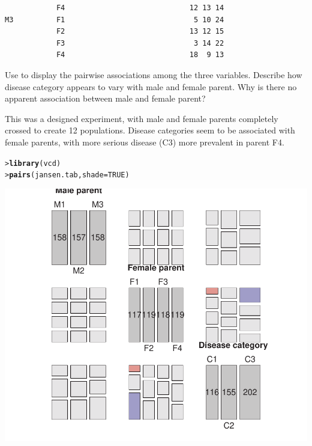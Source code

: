 \documentclass[10pt]{report}\usepackage[]{graphicx}\usepackage[]{color}
\makeatletter
\newcommand{\hlnum}[1]{\textcolor[rgb]{0.686,0.059,0.569}{#1}}%
\newcommand{\hlstd}[1]{\textcolor[rgb]{0.345,0.345,0.345}{#1}}%
\newcommand{\hlkwc}[1]{\textcolor[rgb]{0.333,0.667,0.333}{#1}}%
\newcommand{\hlkwd}[1]{\textcolor[rgb]{0.737,0.353,0.396}{\textbf{#1}}}%
\newenvironment{kframe}{%
 \def\at@end@of@kframe{}%
 \ifinner\ifhmode%
  \def\at@end@of@kframe{\end{minipage}}%
  \begin{minipage}{\columnwidth}%
 \fi\fi%
 \def\FrameCommand##1{\hskip\@totalleftmargin \hskip-\fboxsep
 \colorbox{shadecolor}{##1}\hskip-\fboxsep
     \hskip-\linewidth \hskip-\@totalleftmargin \hskip\columnwidth}%
 \MakeFramed {\advance\hsize-\width
   \@totalleftmargin\z@ \linewidth\hsize
   \@setminipage}}%
 {\par\unskip\endMakeFramed%
 \at@end@of@kframe}
\newenvironment{knitrout}{}{} %
\renewenvironment{knitrout}{\small\renewcommand{\baselinestretch}{.85}}{} %
\makeatother
\begin{document}
\begin{Exercises}
\begin{knitrout}
\begin{kframe}
\begin{verbatim}
            F4                             12 13 14
M3          F1                              5 10 24
            F2                             13 12 15
            F3                              3 14 22
            F4                             18  9 13
\end{verbatim}
\end{kframe}
\end{knitrout}
  \begin{enumerate*}
    \item Use  to display the pairwise associations
    among the three variables.  Describe how disease category appears to vary with male
    and female parent. Why is there no apparent association between male and female parent?
    \begin{ans}
    This was a designed experiment, with male and female parents completely crossed
    to create 12 populations.
    Disease categories seem to be associated with female parents, with more serious
    disease (C3) more prevalent in parent F4.
\begin{knitrout}\footnotesize
{}\color{fgcolor}\begin{kframe}
\begin{alltt}
\hlstd{> }\hlkwd{library}\hlstd{(vcd)}
\hlstd{> }\hlkwd{pairs}\hlstd{(jansen.tab,} \hlkwc{shade}\hlstd{=}\hlnum{TRUE}\hlstd{)}
\end{alltt}
\end{kframe}

\centerline{\includegraphics[width=.6\textwidth]{soln/fig/ex5_6a-1} }



\end{knitrout}
    \end{ans}
    

\end{enumerate*}
\end{Exercises}
\end{document}
